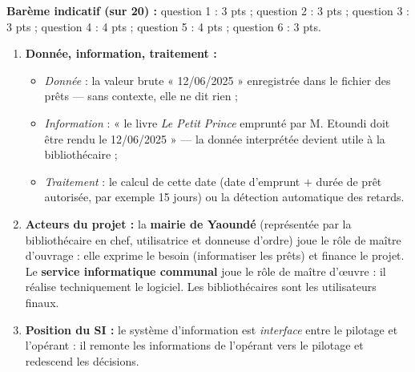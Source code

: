 \documentclass[11pt]{article}
\newcommand{\cle}[1]{{\popxbold\color{popdark}#1}}
\begin{document}
\begin{corrige}
\textbf{Barème indicatif (sur 20) :} question 1 : 3 pts ; question 2 : 3 pts ; question 3 : 3 pts ; question 4 : 4 pts ; question 5 : 4 pts ; question 6 : 3 pts.

\begin{enumerate}
  \item \textbf{Donnée, information, traitement :}
  \begin{itemize}
    \item \emph{Donnée} : la valeur brute « 12/06/2025 » enregistrée dans le fichier des prêts — sans contexte, elle ne dit rien ;
    \item \emph{Information} : « le livre \emph{Le Petit Prince} emprunté par M. Etoundi doit être rendu le 12/06/2025 » — la donnée interprétée devient utile à la bibliothécaire ;
    \item \emph{Traitement} : le calcul de cette date (date d'emprunt $+$ durée de prêt autorisée, par exemple 15 jours) ou la détection automatique des retards.
  \end{itemize}
  \item \textbf{Acteurs du projet :} la \textbf{mairie de Yaoundé} (représentée par la bibliothécaire en chef, utilisatrice et donneuse d'ordre) joue le rôle de \cle{maître d'ouvrage} : elle exprime le besoin (informatiser les prêts) et finance le projet. Le \textbf{service informatique communal} joue le rôle de \cle{maître d'œuvre} : il réalise techniquement le logiciel. Les bibliothécaires sont les utilisateurs finaux.
  \item \textbf{Position du SI :} le système d'information est \emph{interface} entre le pilotage et l'opérant : il remonte les informations de l'opérant vers le pilotage et redescend les décisions.
  \begin{popfigure}
\end{popfigure}
\end{enumerate}
\end{corrige}
\end{document}
